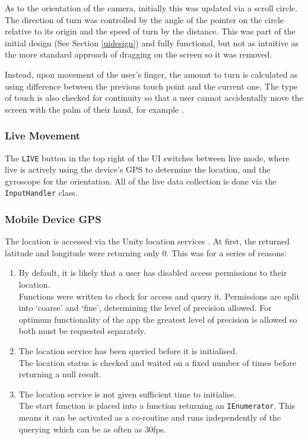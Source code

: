 \documentclass{article}
\begin{document}
As to the orientation of the camera, initially this was updated via a scroll circle. The direction of turn was controlled by the angle of the pointer on the circle relative to its origin and the speed of turn by the distance. This was part of the initial design (See Section \ref{uidesign}) and fully functional, but not as intuitive as the more standard approach of dragging on the screen so it was removed.

Instead, upon movement of the user's finger, the amount to turn is calculated as using difference between the previous touch point and the current one. The type of touch is also checked for continuity so that a user cannot accidentally move the screen with the palm of their hand, for example \cite{movement:touchcontrol}. 

\subsubsection{Live Movement}
The \verb|LIVE| button in the top right of the UI switches between \gls{live} mode, where live is actively using the device's GPS to determine the location, and the gyroscope for the orientation. All of the live data collection is done via the \verb|InputHandler| class. 

\subsubsection{Mobile Device GPS}
The location is accessed via the Unity location services \cite{movement:locationservice}. At first, the returned latitude and longitude were returning only 0. This was for a series of reasons:

\begin{enumerate}
    \item By default, it is likely that a user has disabled access permissions to their location. \\ Functions were written to check for access and query it. Permissions are split into `coarse' and `fine', determining the level of precision allowed. For optimum functionality of the app the greatest level of precision is allowed so both must be requested separately.
    \item The location service has been queried before it is initialised. \\ The location status is checked and waited on a fixed number of times before returning a null result.
    \item The location service is not given sufficient time to initialise. \\ The start function is placed into a function returning an \verb|IEnumerator|. This means it can be activated as a co-routine and runs independently of the querying which can be as often as 30fps.
\end{enumerate}
\end{document}
